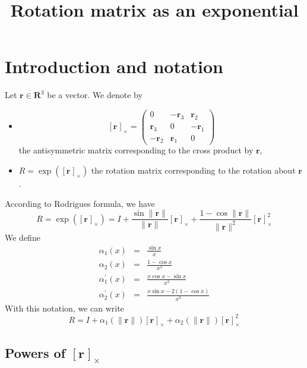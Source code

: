 \documentclass {article}
\title {Rotation matrix as an exponential}
\newcommand\reals{\mathbf{R}}
\newcommand\rot{\mathbf{r}}
\newcommand\rcross[1]{[\rot_{#1}]_{\times}}
\newcommand\normr{\|\rot\|}
\newcommand\alphap{\alpha^{\prime}}
\begin{document}
\maketitle

\section {Introduction and notation}

Let $\rot\in\reals^3$ be a vector. We denote by
\begin{itemize}
\item $$
\rcross{} = \left(\begin{array}{ccc}
0 & -\rot_3 & \rot_2 \\
\rot_3 & 0 & -\rot_1 \\
-\rot_2 & \rot_1 & 0
\end{array}\right)
$$
the antisymmetric matrix corresponding to the cross product by $\rot$,
\item $R = \exp (\rcross{})$ the rotation matrix corresponding to the rotation about
$\rot$.
\end{itemize}
According to Rodrigues formula, we have
\begin{equation}\label{eq:rodrigues}
R = \exp (\rcross{}) = I + \frac{\sin \normr}{\normr}\rcross{} +
\frac{1 - \cos \normr}{\normr^2}\rcross{}^2
\end{equation}
We define
\begin{eqnarray}
\label{eq:alpha1}
\alpha_1 (x) &=& \frac{\sin x}{x}\\
\label{eq:alpha2}
\alpha_2 (x) &=& \frac{1 - \cos x}{x^2}\\
\label{eq:alpha3}
\alphap_1 (x) &=& \frac{x \cos x - \sin x}{x^2}\\
\label{eq:alpha4}
\alphap_2 (x) &=& \frac{x \sin x -2(1-\cos x)}{x^3}
\end{eqnarray}
With this notation, we can write
\begin{equation}\label{eq:rodrigues2}
R = I + \alpha_1 (\normr) \rcross{} + \alpha_2 (\normr) \rcross{}^2
\end{equation}
\subsection {Powers of $\rcross{}$}
\end{document}
